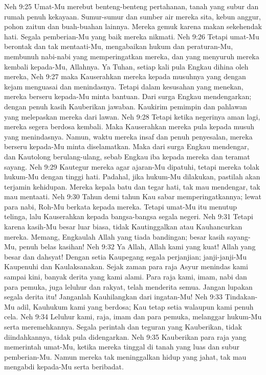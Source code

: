 Neh 9:25  Umat-Mu merebut benteng-benteng pertahanan, tanah yang subur dan rumah penuh kekayaan. Sumur-sumur dan sumber air mereka sita, kebun anggur, pohon zaitun dan buah-buahan lainnya. Mereka gemuk karena makan sekehendak hati. Segala pemberian-Mu yang baik mereka nikmati.
Neh 9:26  Tetapi umat-Mu berontak dan tak mentaati-Mu, mengabaikan hukum dan peraturan-Mu, membunuh nabi-nabi yang memperingatkan mereka, dan yang menyuruh mereka kembali kepada-Mu, Allahnya. Ya Tuhan, setiap kali pula Engkau dihina oleh mereka,
Neh 9:27  maka Kauserahkan mereka kepada musuhnya yang dengan kejam menguasai dan menindasnya. Tetapi dalam kesusahan yang menekan, mereka berseru kepada-Mu minta bantuan. Dari surga Engkau mendengarkan; dengan penuh kasih Kauberikan jawaban. Kaukirim pemimpin dan pahlawan yang melepaskan mereka dari lawan.
Neh 9:28  Tetapi ketika negerinya aman lagi, mereka segera berdosa kembali. Maka Kauserahkan mereka pula kepada musuh yang menindasnya. Namun, waktu mereka insaf dan penuh penyesalan, mereka berseru kepada-Mu minta diselamatkan. Maka dari surga Engkau mendengar, dan Kautolong berulang-ulang, sebab Engkau iba kepada mereka dan teramat sayang.
Neh 9:29  Kautegur mereka agar ajaran-Mu dipatuhi, tetapi mereka tolak hukum-Mu dengan tinggi hati. Padahal, jika hukum-Mu dilakukan, pastilah akan terjamin kehidupan. Mereka kepala batu dan tegar hati, tak mau mendengar, tak mau mentaati.
Neh 9:30  Tahun demi tahun Kau sabar memperingatkannya; lewat para nabi, Roh-Mu berkata kepada mereka. Tetapi umat-Mu itu menutup telinga, lalu Kauserahkan kepada bangsa-bangsa segala negeri.
Neh 9:31  Tetapi karena kasih-Mu besar luar biasa, tidak Kautinggalkan atau Kauhancurkan mereka. Memang, Engkaulah Allah yang tiada bandingan; besar kasih sayang-Mu, penuh belas kasihan!
Neh 9:32  Ya Allah, Allah kami yang kuat! Allah yang besar dan dahsyat! Dengan setia Kaupegang segala perjanjian; janji-janji-Mu Kaupenuhi dan Kaulaksanakan. Sejak zaman para raja Asyur menindas kami sampai kini, banyak derita yang kami alami. Para raja kami, imam, nabi dan para pemuka, juga leluhur dan rakyat, telah menderita semua. Jangan lupakan segala derita itu! Janganlah Kauhilangkan dari ingatan-Mu!
Neh 9:33  Tindakan-Mu adil, Kauhukum kami yang berdosa; Kau tetap setia walaupun kami penuh cela.
Neh 9:34  Leluhur kami, raja, imam dan para pemuka, melanggar hukum-Mu serta meremehkannya. Segala perintah dan teguran yang Kauberikan, tidak diindahkannya, tidak pula didengarkan.
Neh 9:35  Kauberikan para raja yang memerintah umat-Mu, ketika mereka tinggal di tanah yang luas dan subur pemberian-Mu. Namun mereka tak meninggalkan hidup yang jahat, tak mau mengabdi kepada-Mu serta beribadat.
